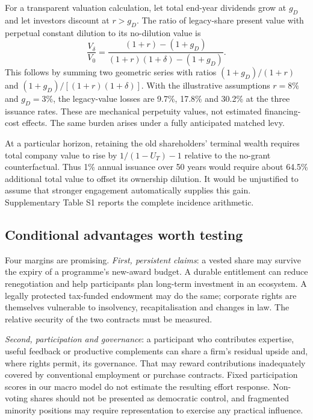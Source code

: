 For a transparent valuation calculation, let total end-year dividends grow at $g_D$ and let investors discount at $r>g_D$. The ratio of legacy-share present value with perpetual constant dilution to its no-dilution value is
\begin{equation}
\frac{V_\delta}{V_0}=\frac{(1+r)-(1+g_D)}{(1+r)(1+\delta)-(1+g_D)}.\label{eq:pv}
\end{equation}
This follows by summing two geometric series with ratios $(1+g_D)/(1+r)$ and $(1+g_D)/[(1+r)(1+\delta)]$. With the illustrative assumptions $r=8\%$ and $g_D=3\%$, the legacy-value losses are 9.7\%, 17.8\% and 30.2\% at the three issuance rates. These are mechanical perpetuity values, not estimated financing-cost effects. The same burden arises under a fully anticipated matched levy.

At a particular horizon, retaining the old shareholders' terminal wealth requires total company value to rise by $1/(1-U_T)-1$ relative to the no-grant counterfactual. Thus 1\% annual issuance over 50 years would require about 64.5\% additional total value to offset its ownership dilution. It would be unjustified to assume that stronger engagement automatically supplies this gain. Supplementary Table S1 reports the complete incidence arithmetic.

\subsection{Conditional advantages worth testing}
Four margins are promising. \emph{First, persistent claims}: a vested share may survive the expiry of a programme's new-award budget. A durable entitlement can reduce renegotiation and help participants plan long-term investment in an ecosystem. A legally protected tax-funded endowment may do the same; corporate rights are themselves vulnerable to insolvency, recapitalisation and changes in law. The relative security of the two contracts must be measured.

\emph{Second, participation and governance}: a participant who contributes expertise, useful feedback or productive complements can share a firm's residual upside and, where rights permit, its governance. That may reward contributions inadequately covered by conventional employment or purchase contracts. Fixed participation scores in our macro model do not estimate the resulting effort response. Non-voting shares should not be presented as democratic control, and fragmented minority positions may require representation to exercise any practical influence.

